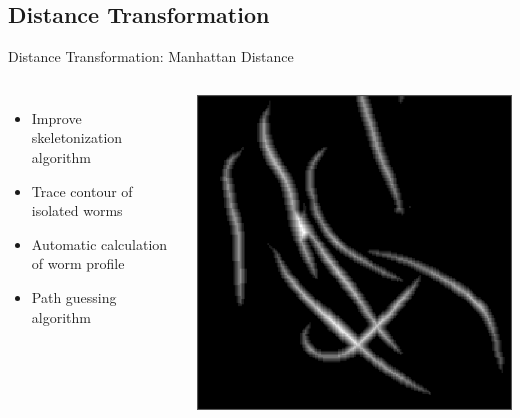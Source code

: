 \documentclass{beamer}
\begin{document}

\subsection{Distance Transformation}
\begin{frame}{Distance Transformation: Manhattan Distance}

\begin{columns}[c]
\column{2.4in}
\begin{itemize}
\item Improve skeletonization algorithm \pause
\item Trace contour of isolated worms \pause
\item Automatic calculation of worm profile \pause
\item Path guessing algorithm
\end{itemize}
\column{2in}
\includegraphics[scale=0.27]{results/test1/dt-shape1}

\end{columns}

\end{frame}


\end{document}
